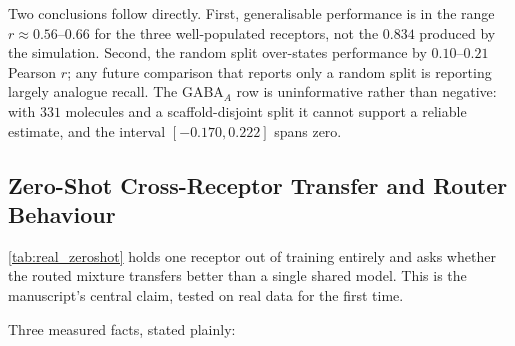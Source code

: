Two conclusions follow directly. First, generalisable performance is in the range $r \approx 0.56$--$0.66$ for the three well-populated receptors, not the $0.834$ produced by the simulation. Second, the random split over-states performance by $0.10$--$0.21$ Pearson $r$; any future comparison that reports only a random split is reporting largely analogue recall. The GABA$_A$ row is uninformative rather than negative: with $331$ molecules and a scaffold-disjoint split it cannot support a reliable estimate, and the interval $[-0.170, 0.222]$ spans zero.

\subsection{Zero-Shot Cross-Receptor Transfer and Router Behaviour}

\cref{tab:real_zeroshot} holds one receptor out of training entirely and asks whether the routed mixture transfers better than a single shared model. This is the manuscript's central claim, tested on real data for the first time.

\begin{table}[!ht]
\centering
\small
\caption{\textbf{Real measured leave-one-receptor-out transfer.} Target receptors are never seen during training. The uniform-router column is the router-blindness control. Gate entropy is reported against the maximum $\ln 4 = 1.386$.}
\label{tab:real_zeroshot}
\end{table}

Three measured facts, stated plainly:

